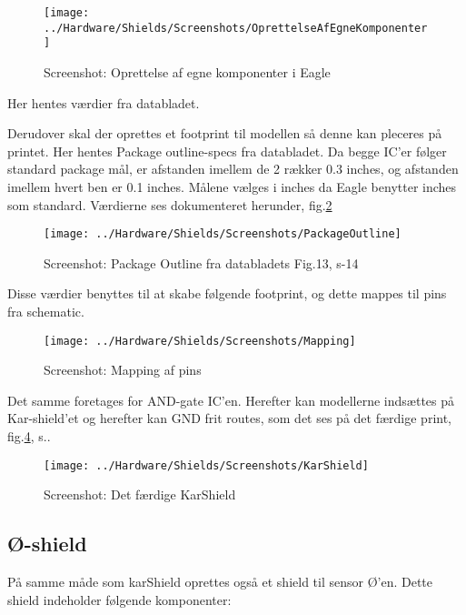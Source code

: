 \begin{figure}[H]
	\centering
	\texttt{[image: ../Hardware/Shields/Screenshots/OprettelseAfEgneKomponenter]}
	\caption{Screenshot: Oprettelse af egne komponenter i Eagle}
	\label{screenshot:EagleComponents}
\end{figure}

Her hentes værdier fra databladet.

Derudover skal der oprettes et footprint til modellen så denne kan pleceres på printet. Her hentes Package outline-specs fra databladet. Da begge IC'er følger standard package mål, er afstanden imellem de 2 rækker 0.3 inches, og afstanden imellem hvert ben er 0.1 inches. 
Målene vælges i inches da Eagle benytter inches som standard. Værdierne ses dokumenteret herunder, fig.\ref{screenshot:PackageOutline} 

\begin{figure}[H]
	\centering
	\texttt{[image: ../Hardware/Shields/Screenshots/PackageOutline]}
	\caption{Screenshot: Package Outline fra databladets Fig.13, s-14 }
	\label{screenshot:PackageOutline}
\end{figure}

	
Disse værdier benyttes til at skabe følgende footprint, og dette mappes til pins fra schematic. 

\begin{figure}[H]
	\centering
	\texttt{[image: ../Hardware/Shields/Screenshots/Mapping]}
	\caption{Screenshot: Mapping af pins}
	\label{screenshot:Mapping}
\end{figure}
	
Det samme foretages for AND-gate IC'en. 
Herefter kan modellerne indsættes på Kar-shield'et og herefter kan GND frit routes, som det ses på det færdige print, fig.\ref{screenshot:karShield}, s.\pageref{screenshot:karShield}.


\newpage
\begin{figure}[H]
	\centering
	\texttt{[image: ../Hardware/Shields/Screenshots/KarShield]}
	\caption{Screenshot: Det færdige KarShield}
	\label{screenshot:karShield}
\end{figure}




\newpage
\subsection{Ø-shield}

På samme måde som karShield oprettes også et shield til sensor Ø'en. Dette shield indeholder følgende komponenter: 

